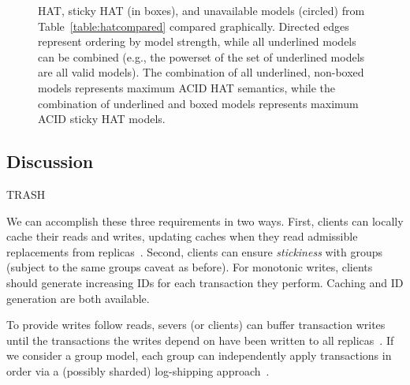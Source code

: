 \begin{figure}
\label{fig:hat-order}
\caption{HAT, sticky HAT (in boxes), and unavailable models (circled)
  from Table~\protect\ref{table:hatcompared} compared
  graphically. Directed edges represent ordering by model strength,
  while all underlined models can be combined (e.g., the powerset of
  the set of underlined models are all valid models). The combination
  of all underlined, non-boxed models represents maximum ACID HAT
  semantics, while the combination of underlined and boxed models
  represents maximum ACID sticky HAT models.}
\label{fig:hatcompared}
\end{figure}


\subsection{Discussion}
\label{sec:discussion}





TRASH

We can accomplish these three requirements in two ways. First, clients
can locally cache their reads and writes, updating caches when they
read admissible replacements from
replicas~\cite{sessionguarantees}. Second, clients can ensure
\textit{stickiness} with groups~\cite{vogels-defs} (subject to the
same groups caveat as before).  For monotonic writes, clients should
generate increasing IDs for each transaction they perform. Caching and
ID generation are both available.

To provide writes follow reads,
severs (or clients) can buffer transaction writes until the
transactions the writes depend on have been written to all
replicas~\cite{cops}. If we consider a group model, each group can
independently apply transactions in order via a (possibly sharded)
log-shipping approach~\cite{causalmemory, cops, eiger, swift}.




